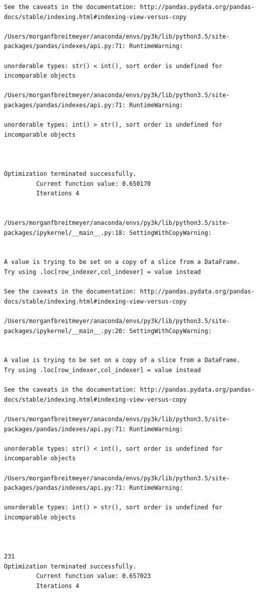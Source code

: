 \begin{lstlisting}
See the caveats in the documentation: http://pandas.pydata.org/pandas-docs/stable/indexing.html#indexing-view-versus-copy

/Users/morganfbreitmeyer/anaconda/envs/py3k/lib/python3.5/site-packages/pandas/indexes/api.py:71: RuntimeWarning:

unorderable types: str() < int(), sort order is undefined for incomparable objects

/Users/morganfbreitmeyer/anaconda/envs/py3k/lib/python3.5/site-packages/pandas/indexes/api.py:71: RuntimeWarning:

unorderable types: int() > str(), sort order is undefined for incomparable objects



Optimization terminated successfully.
         Current function value: 0.650170
         Iterations 4


/Users/morganfbreitmeyer/anaconda/envs/py3k/lib/python3.5/site-packages/ipykernel/__main__.py:18: SettingWithCopyWarning:


A value is trying to be set on a copy of a slice from a DataFrame.
Try using .loc[row_indexer,col_indexer] = value instead

See the caveats in the documentation: http://pandas.pydata.org/pandas-docs/stable/indexing.html#indexing-view-versus-copy

/Users/morganfbreitmeyer/anaconda/envs/py3k/lib/python3.5/site-packages/ipykernel/__main__.py:20: SettingWithCopyWarning:


A value is trying to be set on a copy of a slice from a DataFrame.
Try using .loc[row_indexer,col_indexer] = value instead

See the caveats in the documentation: http://pandas.pydata.org/pandas-docs/stable/indexing.html#indexing-view-versus-copy

/Users/morganfbreitmeyer/anaconda/envs/py3k/lib/python3.5/site-packages/pandas/indexes/api.py:71: RuntimeWarning:

unorderable types: str() < int(), sort order is undefined for incomparable objects

/Users/morganfbreitmeyer/anaconda/envs/py3k/lib/python3.5/site-packages/pandas/indexes/api.py:71: RuntimeWarning:

unorderable types: int() > str(), sort order is undefined for incomparable objects



231
Optimization terminated successfully.
         Current function value: 0.657023
         Iterations 4



\end{lstlisting}
